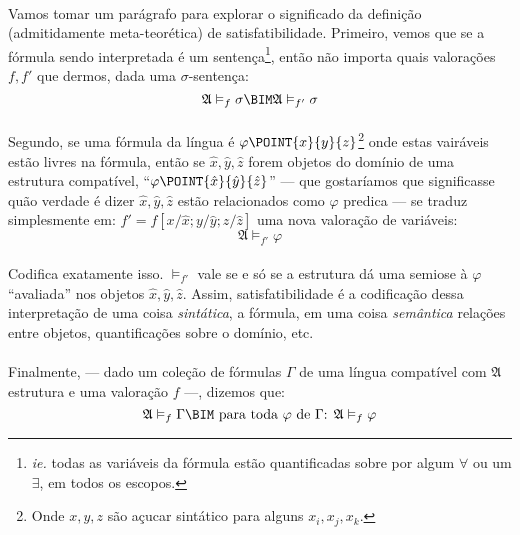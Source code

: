         \paragraph{}
            Vamos tomar um parágrafo para explorar o significado
            da definição (admitidamente meta-teorética) de
            satisfatibilidade. Primeiro, vemos que se a fórmula
            sendo interpretada é um sentença\footnote{{\em ie.}
            todas as variáveis da fórmula estão quantificadas
            sobre por algum $\forall$ ou um $\exists$, em todos
            os escopos.}, então não importa quais valorações $f,
            f'$ que dermos, dada uma $\sigma$-sentença:
            $$ \mathfrak{A}\vDash_{f} \sigma \BIM \mathfrak{A}\vDash_{f'} \sigma $$
        \paragraph{}
            Segundo, se uma fórmula da língua é $\varphi\POINT{x}{y}{z}$\footnote{
            Onde $x,y,z$ são açucar sintático para alguns $x_i,
            x_j, x_k$.} onde estas vairáveis estão livres na
            fórmula, então se $\hat{x}, \hat{y}, \hat{z}$ forem
            objetos do domínio de uma estrutura compatível,
            ``$\varphi\POINT{\hat{x}}{\hat{y}}{\hat{z}}$'' ---
            que gostaríamos que significasse quão verdade é dizer %
            $\hat{x}, \hat{y}, \hat{z}$ estão relacionados como
            $\varphi$ predica --- se traduz simplesmente em:
            $f'=f[x\slash\hat x; y\slash\hat y; z\slash\hat z]$
            uma nova valoração de variáveis:
            $$ \mathfrak{A}\vDash_{f'} \varphi $$
        \paragraph{}
            Codifica exatamente isso. $\vDash_{f'}$ vale se e só
            se a estrutura dá uma semiose à $\varphi$ ``avaliada'' %
            nos objetos $\hat{x},\hat{y},\hat{z}$. Assim,
            satisfatibilidade é a codificação dessa interpretação
            de uma coisa {\em sintática}, a fórmula, em uma coisa
            {\em semântica} relações entre objetos, quantificações
            sobre o domínio, etc.
        \paragraph{}
            Finalmente, --- dado um coleção de fórmulas $\Gamma$
            de uma língua compatível com $\mathfrak A$ estrutura e uma
            valoração $f$ ---, dizemos que:
            $$\mathfrak{A}\vDash_f\Gamma\BIM\text{ para toda }\varphi\text{ de }\Gamma\text{: }\mathfrak{A}\vDash_f\varphi$$

